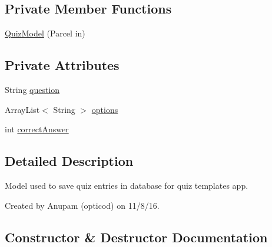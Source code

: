 \subsection*{Private Member Functions}
\begin{DoxyCompactItemize}
\item 
\hyperlink{classorg_1_1buildmlearn_1_1quiztime_1_1data_1_1QuizModel_a3dd0c4cfc6e1e5ff12cda78729732555}{Quiz\+Model} (Parcel in)
\end{DoxyCompactItemize}
\subsection*{Private Attributes}
\begin{DoxyCompactItemize}
\item 
String \hyperlink{classorg_1_1buildmlearn_1_1quiztime_1_1data_1_1QuizModel_a766d7c74280ac9f78f0ef37b81a98992}{question}
\item 
Array\+List$<$ String $>$ \hyperlink{classorg_1_1buildmlearn_1_1quiztime_1_1data_1_1QuizModel_a1bc4a9ea2622409109f2b6b48080d31c}{options}
\item 
int \hyperlink{classorg_1_1buildmlearn_1_1quiztime_1_1data_1_1QuizModel_ad061f6ad5ac348ef167a366c95d707e9}{correct\+Answer}
\end{DoxyCompactItemize}


\subsection{Detailed Description}
Model used to save quiz entries in database for quiz template\textquotesingle{}s app. 

Created by Anupam (opticod) on 11/8/16. 

\subsection{Constructor \& Destructor Documentation}
